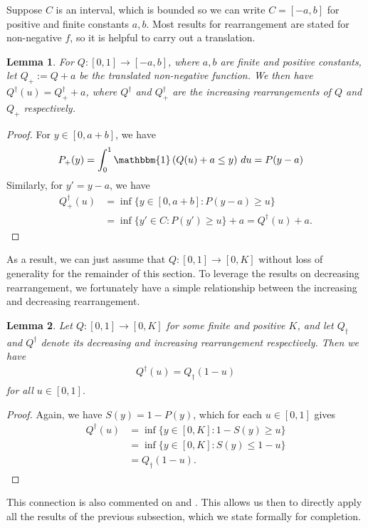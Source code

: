 \documentclass[11pt,a4paper]{article}
\newtheorem{lem}{Lemma}
\begin{document}
\begin{appendices}
Suppose $C$ is an interval, which is bounded so we can write $C = [-a,b]$ for positive and finite constants $a,b$. Most results for rearrangement are stated for non-negative $f$, so it is helpful to carry out a translation.
\begin{lem}
For $Q: [0,1] \to [-a,b]$, where $a,b$ are finite and positive constants, let $Q_+ := Q+a$ be the translated non-negative function.  We then have $Q^{\dagger}(u) = Q_+^{\dagger}+a$, where $Q^{\dagger}$ and $Q_+^{\dagger}$ are the increasing rearrangements of $Q$ and $Q_+$ respectively.
\end{lem}
\begin{proof}
   For $y \in [0,a+b]$, we have
\begin{align*}
    P_+(y) &= \int_0^1\mathbbm{1}\left(Q(u) + a \leq y\right)\,du=P(y - a)
\end{align*}
Similarly, for  $y' = y- a$, we have
\begin{align*}
    Q_+^{\dagger}(u) &=\inf\{y \in [0,a+b]: P(y-a) \geq u\}\\
    &= \inf\{y' \in C: P(y') \geq u\}  + a = Q^{\dagger}(u) + a.
\end{align*}
\end{proof}
  As a result, we can just assume that $Q: [0,1] \to [0,K]$ without loss of generality for the remainder of this section. To leverage the results on decreasing rearrangement, we fortunately have a simple relationship between the increasing and decreasing rearrangement.
\begin{lem}{\label{app:lem_inc_dec}}
Let $Q: [0,1] \to [0,K]$ for some finite and positive $K$, and let $Q_{\dagger}$ and $Q^{\dagger}$ denote its decreasing and increasing rearrangement respectively. Then we have
\begin{align*}
    Q^{\dagger}(u) = Q_{\dagger}(1-u)
\end{align*}
for all $u \in [0,1]$.
\end{lem}
\begin{proof}
  Again, we have $S(y) = 1 - P(y)$,
which for each $u \in [0,1]$ gives
\begin{align*}
    Q^{\dagger}(u) &= \inf\{y \in [0,K]: 1- S(y)\geq u\}\\
    &= \inf\{y \in [0,K]: S(y) \leq 1- u\}\\
    &= Q_{\dagger}(1-u).
\end{align*}  
\end{proof}
This connection is also commented on \citet[Section 1]{Korenovskii2007} and \citet[Exercise 1.4.1]{Kesavan2006}. This allows us then to directly apply all the results of the previous subsection, which we state formally for completion. 

\end{appendices}
\end{document}
